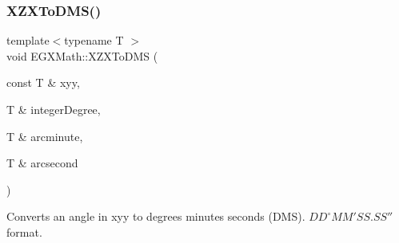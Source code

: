 \mbox{\label{group___e_g_x_math-_angle_conversions-_x_z_x_ga115e1f974ad75405c5a6adc880616ef0}} 
\subsubsection{\texorpdfstring{X\+Z\+X\+To\+D\+M\+S()}{XZXToDMS()}}
{\footnotesize\ttfamily template$<$typename T $>$ \\
void E\+G\+X\+Math\+::\+X\+Z\+X\+To\+D\+MS (\begin{DoxyParamCaption}\item[{const T \&}]{xyy,  }\item[{T \&}]{integer\+Degree,  }\item[{T \&}]{arcminute,  }\item[{T \&}]{arcsecond }\end{DoxyParamCaption})}



Converts an angle in xyy to degrees minutes seconds (D\+MS). ${DD}^{\circ}{MM}'{SS.SS}''$ format. 

